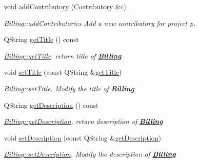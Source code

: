 \begin{DoxyCompactItemize}
void \hyperlink{classModels_1_1Billing_a3636d785d2cb77d83d21a795e1f91a60}{add\+Contributory} (\hyperlink{classModels_1_1Contributory}{Contributory} \&c)
\begin{DoxyCompactList}\small\item\em Billing\+::add\+Contributories Add a new contributory for project p. \end{DoxyCompactList}\item 
Q\+String \hyperlink{classModels_1_1Billing_a15cd358ce3cab05668c62c0771afdb85}{get\+Title} () const 
\begin{DoxyCompactList}\small\item\em \hyperlink{classModels_1_1Billing_a15cd358ce3cab05668c62c0771afdb85}{Billing\+::get\+Title}. return title of {\bfseries \hyperlink{classModels_1_1Billing}{Billing}} \end{DoxyCompactList}\item 
void \hyperlink{classModels_1_1Billing_ae20cea169abdffa5daaa368547425928}{set\+Title} (const Q\+String \&\hyperlink{classModels_1_1Billing_a15cd358ce3cab05668c62c0771afdb85}{get\+Title})
\begin{DoxyCompactList}\small\item\em \hyperlink{classModels_1_1Billing_ae20cea169abdffa5daaa368547425928}{Billing\+::set\+Title}. Modify the title of {\bfseries \hyperlink{classModels_1_1Billing}{Billing}} \end{DoxyCompactList}\item 
Q\+String \hyperlink{classModels_1_1Billing_a5802215da8f4407457b8aeb7be525c65}{get\+Description} () const 
\begin{DoxyCompactList}\small\item\em \hyperlink{classModels_1_1Billing_a5802215da8f4407457b8aeb7be525c65}{Billing\+::get\+Description}. return description of {\bfseries \hyperlink{classModels_1_1Billing}{Billing}} \end{DoxyCompactList}\item 
void \hyperlink{classModels_1_1Billing_adb5cf4382150387f10bb6b774ace6bc8}{set\+Description} (const Q\+String \&\hyperlink{classModels_1_1Billing_a5802215da8f4407457b8aeb7be525c65}{get\+Description})
\begin{DoxyCompactList}\small\item\em \hyperlink{classModels_1_1Billing_adb5cf4382150387f10bb6b774ace6bc8}{Billing\+::set\+Description}. Modify the description of {\bfseries \hyperlink{classModels_1_1Billing}{Billing}} \end{DoxyCompactList}\item 

\end{DoxyCompactItemize}
